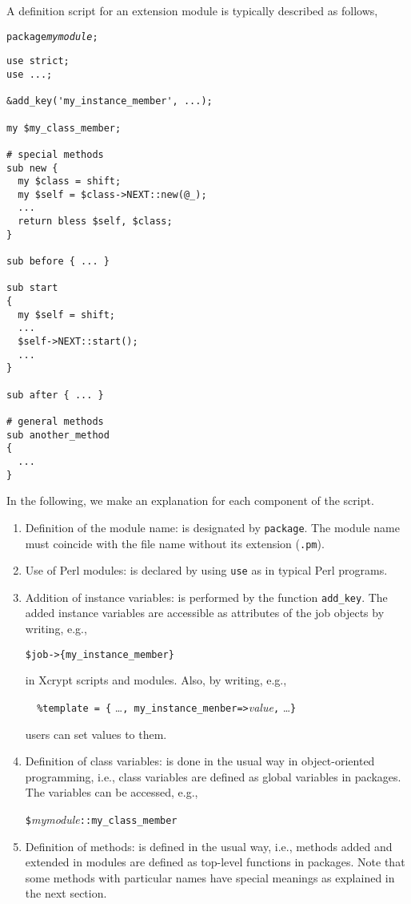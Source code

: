 \documentclass[a4paper,10pt]{report}
\def\|{\verb|} %|
\begin{document}
A definition script for an extension module is typically described as follows,
\begin{boxnote}
  \begin{alltt}
package {\it mymodule};
  \end{alltt}
\begin{verbatim}
use strict;
use ...;

&add_key('my_instance_member', ...);

my $my_class_member;

# special methods
sub new {
  my $class = shift;
  my $self = $class->NEXT::new(@_);
  ... 
  return bless $self, $class;
}

sub before { ... }

sub start
{
  my $self = shift;
  ...
  $self->NEXT::start();
  ...
}

sub after { ... }

# general methods
sub another_method
{
  ...
}
\end{verbatim}
\end{boxnote}
\vspace{\baselineskip}

In the following, we make an explanation for each component of the script.
\begin{enumerate}
  \item Definition of the module name: is designated by \|package|.
	The module name must coincide with the file name
        without its extension (\|.pm|).
  \item Use of Perl modules: is declared by using \|use|
        as in typical Perl programs.
  \item Addition of instance variables: is performed by the function
	\|add_key|.  The added instance variables are accessible as
	attributes of the job objects by writing, e.g.,
	\begin{center}
	 \|$job->{my_instance_member}|
	\end{center}
	in Xcrypt scripts and modules.  Also, by writing, e.g.,
	\begin{center}
	 \|  |\|%
	\end{center}
	users can set values to them.
 \item Definition of class variables: is done in the usual way in
       object-oriented programming, i.e., class variables are defined
       as global variables in packages.  The variables can be
       accessed, e.g.,
	 \begin{center}
	  \|$|{\it mymodule}\|::my_class_member|
	 \end{center}
  \item Definition of methods: is defined in the usual way, i.e.,
	methods added and extended in modules are defined as top-level
	functions in packages.  Note that some methods with
	particular names have special meanings as explained in the next
	section.
\end{enumerate}
\end{document}
